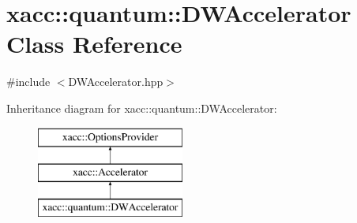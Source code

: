 \hypertarget{a00042}{}\section{xacc\+:\+:quantum\+:\+:D\+W\+Accelerator Class Reference}
\label{a00042}


{\ttfamily \#include $<$D\+W\+Accelerator.\+hpp$>$}

Inheritance diagram for xacc\+:\+:quantum\+:\+:D\+W\+Accelerator\+:\begin{figure}[H]
\begin{center}
\leavevmode
\includegraphics[height=3.000000cm]{a00042}
\end{center}
\end{figure}
